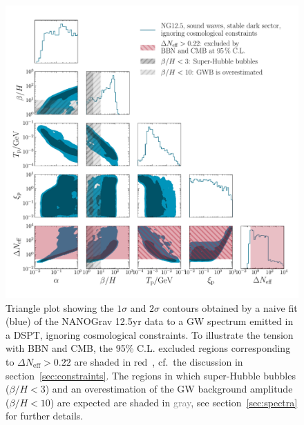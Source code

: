 \begin{figure}[t]
	\centering
	\includegraphics[width=\linewidth]{thesisplots/ptbbn/ptbbn_1}
	\caption{Triangle plot showing the $1\sigma$ and $2\sigma$ contours
		obtained by a naive fit (\textcolor{DESYdunkelblau}{blue}) of the \ac{NANOGrav} 12.5yr data to a \ac{GW} spectrum emitted in a \ac{DSPT}, ignoring cosmological constraints. To illustrate the tension with \ac{BBN} and \ac{CMB}, the 95\% C.L. excluded regions corresponding to $\Delta N_\text{eff} > 0.22$ are shaded in \textcolor{DESYdunkelrot}{red}~\cite{Yeh:2022heq}, cf.~the discussion in section~\ref{sec:constraints}. The regions in which super-Hubble bubbles ($\beta/H < 3$) and an overestimation of the \ac{GW} background amplitude ($\beta/H < 10$) are expected are shaded in \textcolor{gray}{gray}, see section~\ref{sec:spectra} for further details.}
	\label{fig:Neff_plot}
\end{figure}

